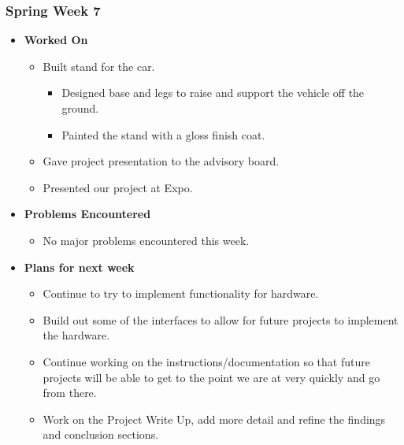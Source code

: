 \documentclass[compsoc,draftclsnofoot,onecolumn,10pt]{IEEEtran}
\begin{document}
\subsubsection{Spring Week 7}
\begin{itemize}
    \item {\textbf{Worked On}}
    \begin{itemize}
        \item Built stand for the car.
        \begin{itemize}
            \item Designed base and legs to raise and support the vehicle off the ground.
            \item Painted the stand with a gloss finish coat.
        \end{itemize}
        \item Gave project presentation to the advisory board.
        \item Presented our project at Expo.
    \end{itemize}

    \item {\textbf{Problems Encountered}}
    \begin{itemize}
        \item No major problems encountered this week.
    \end{itemize}

    \item{\textbf{Plans for next week}}
    \begin{itemize}
        \item Continue to try to implement functionality for hardware.
        \item Build out some of the interfaces to allow for future projects to implement the hardware.
        \item Continue working on the instructions/documentation so that future projects will be able to get to the point we are at very quickly and go from there.
        \item Work on the Project Write Up, add more detail and refine the findings and conclusion sections.
    \end{itemize}
\end{itemize}
\end{document}

